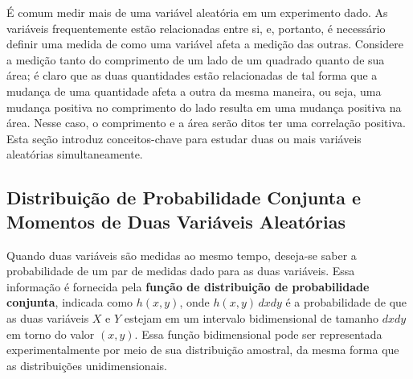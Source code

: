 É comum medir mais de uma variável aleatória em um experimento dado. As variáveis frequentemente estão relacionadas entre si, e, portanto, é necessário definir uma medida de como uma variável afeta a medição das outras. Considere a medição tanto do comprimento de um lado de um quadrado quanto de sua área; é claro que as duas quantidades estão relacionadas de tal forma que a mudança de uma quantidade afeta a outra da mesma maneira, ou seja, uma mudança positiva no comprimento do lado resulta em uma mudança positiva na área. Nesse caso, o comprimento e a área serão ditos ter uma correlação positiva. Esta seção introduz conceitos-chave para estudar duas ou mais variáveis aleatórias simultaneamente.

\subsection{Distribuição de Probabilidade Conjunta e Momentos de Duas Variáveis Aleatórias}\label{sec:2.4.1}

Quando duas variáveis são medidas ao mesmo tempo, deseja-se saber a probabilidade de um par de medidas dado para as duas variáveis. Essa informação é fornecida pela \textbf{função de distribuição de probabilidade conjunta}, indicada como $h(x, y)$, onde $h(x, y)\,dxdy$ é a probabilidade de que as duas variáveis $X$ e $Y$ estejam em um intervalo bidimensional de tamanho $dxdy$ em torno do valor $(x, y)$. Essa função bidimensional pode ser representada experimentalmente por meio de sua distribuição amostral, da mesma forma que as distribuições unidimensionais.

